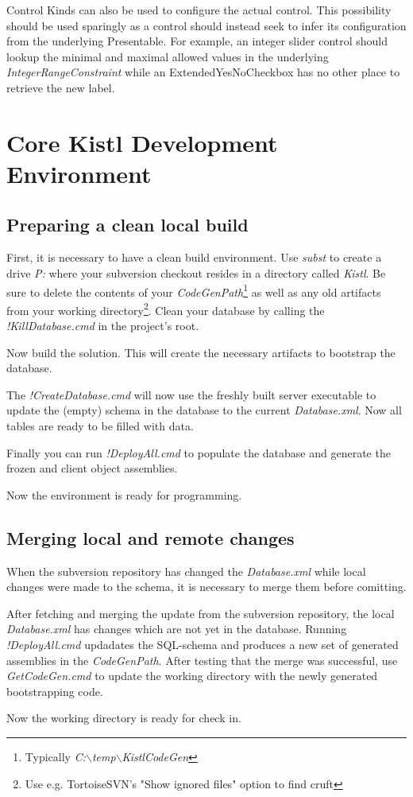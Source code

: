 Control Kinds can also be used to configure the actual control. This
possibility should be used sparingly as a control should instead seek to
infer its configuration from the underlying Presentable. For example, an
integer slider control should lookup the minimal and maximal allowed
values in the underlying \emph{IntegerRangeConstraint} while an
ExtendedYesNoCheckbox has no other place to retrieve the new label.


\section{Core Kistl Development Environment}

\subsection{Preparing a clean local build}


First, it is necessary to have a clean build environment. Use
\emph{subst} to create a drive \emph{P:} where your subversion checkout
resides in a directory called \emph{Kistl}. Be sure to delete the
contents of your \emph{CodeGenPath}\footnote{Typically
\emph{C:$\backslash$temp$\backslash$KistlCodeGen}} as well as any old
artifacts from your working directory\footnote{Use e.g. TortoiseSVN's
"Show ignored files" option to find cruft}. Clean your database by
calling the \emph{!KillDatabase.cmd} in the project's root.

Now build the solution. This will create the necessary artifacts to
bootstrap the database.

The \emph{!CreateDatabase.cmd} will now use the freshly built server
executable to update the (empty) schema in the database to the current
\emph{Database.xml}. Now all tables are ready to be filled with data.

Finally you can run \emph{!DeployAll.cmd} to populate the database and
generate the frozen and client object assemblies.

Now the environment is ready for programming.

\subsection{Merging local and remote changes}

When the subversion repository has changed the \emph{Database.xml} while
local changes were made to the schema, it is necessary to merge them
before comitting.

After fetching and merging the update from the subversion repository,
the local \emph{Database.xml} has changes which are not yet in the
database. Running \emph{!DeployAll.cmd} updadates the SQL-schema and
produces a new set of generated assemblies in the \emph{CodeGenPath}.
After testing that the merge was successful, use \emph{GetCodeGen.cmd}
to update the working directory with the newly generated bootstrapping
code.

Now the working directory is ready for check in.



